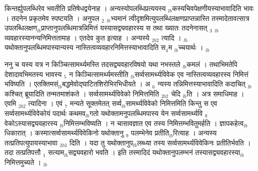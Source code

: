\documentclass[article,12pt,a4paper]{memoir}%
\newcounter{parCount}
\begin{document}
	  
	  \pstart \leavevmode%
	किन्तर्ह्युपलब्धिरेव भवतीति प्रतिषेधद्वयेनाह । अन्यस्योपलब्धिप्रत्ययस्य {\tiny $_{lb}$}कस्यचिवपेक्षणीयस्याभावादिति भावः । तदनेन प्रकृतमेव स्पष्टयति । अनुपल {\tiny $_{2}$} {\tiny $_{lb}$}भ्यमानं त्वीदृशमित्युपलब्धिलक्षणप्राप्तन्नास्ति तस्मादेतावत्सात्र उपलब्धिलक्षण{\tiny $_{lb}$}प्राप्तानुपलब्धिमात्रन्निमित्तं यस्यासद्व्यवहारस्य स तथा ख्यातः तदनेनासत् {\tiny $_{3}$} {\tiny $_{lb}$} \leavevmode{} व्यवहारस्यानन्यनिमित्ततामाह । एतदेव कुत इत्याह । {\color{DodgerBlue3}अन्यस्ये} {\tiny $_{2b2}$} त्यादि । {\tiny $_{lb}$}यथोक्तानुपलब्धिमपास्यान्यस्य नास्तित्वव्यवहारनिमित्तस्याभावादिति स{\tiny $_{4}$}म {\tiny $_{lb}$}च्चयार्थः ।
	{}
	\pend%
      {\tiny $_{lb}$}

	  
	  \pstart \leavevmode%
	ननु च यस्य यत्र न किञ्चित्सामर्थ्यमस्ति तदसद्व्यवहारविषयो यथा नभस्तले {\tiny $_{lb}$}कमलं । तथाभिमतेपि देशादावभिमतस्य भावस्य {\tiny $_{5}$} न किञ्चित्सामर्थ्यमस्तीति {\tiny $_{lb}$}सर्व्वसामर्थ्यविवेक एव नास्तित्वव्यवहारस्य निमित्तं भविष्यति । एतक्तिमसं{\tiny $_{lb}$}बद्धमेवोद्घाटितशिरोभिरभिधीयते । अ {\tiny $_{6}$} न्यस्य तन्निमित्तस्याभावादिति कदाचित् {\tiny $_{lb}$}कश्चित् ब्रूयादिति तन्मतमाशंकते । {\color{DodgerBlue3}सर्व्वसामर्थ्यविवेको निमित्तमिति} {\tiny $_{2b2}$} चेदि {\tiny $_{lb}$}ति । अत्र समाधिमाह । {\color{DodgerBlue3}एवमि} {\tiny $_{2b2}$} त्यादिना । एवं {\tiny $_{7}$} मन्यते सूक्तमेतत् सर्व्व{\tiny $_{lb}$}सामर्थ्यविवेको निमित्तमिति किन्तु स एव सर्व्वसामर्थ्यविवेकोयं पदार्थः कथमव{\tiny $_{lb}$}गतो यथोक्तामनुपलब्धिमपास्य येन सर्व्वसामर्थ्यवि {\tiny $_{8}$} वेकोऽस्यासद्व्यवहारस्य {\tiny $_{lb}$}निमित्तम्भविष्यति । न चासावज्ञात एव तस्य निमित्तम्भवितुमर्हति । ज्ञापकहेत्व{\tiny $_{lb}$}धिकारात् । कस्मात्सर्व्वसामर्थ्यविवेकिनो यथोक्तानु {\tiny $_{9}$} \leavevmode{} पलम्भेनेव प्रतीति{\tiny $_{lb}$}रित्याह । {\color{DodgerBlue3}अन्यस्य तत्प्रतिपत्युपायस्याभावा} {\tiny $_{2b3}$} दिति । यदा तु यथोक्तानुप{\tiny $_{lb}$}लब्ध्या तस्य सर्व्वसामर्थ्यविवेकिनः प्रतीतिर्भवति । तदा तत्प्रतिपत्तौ {\tiny $_{1}$} सत्याम{\tiny $_{lb}$}सद्व्यवहारो भवति । इति तस्मादिदं यथोक्तानुपलम्भनं तस्यासद्व्यवहारस्या{\tiny $_{lb}$}निमित्तमुच्यते ।
	{}
	\pend%
      {\tiny $_{lb}$}
\end{document}
